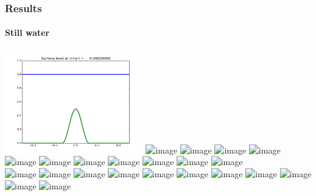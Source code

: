 \documentclass{beamer}
\begin{document}
\begin{frame}
  \frametitle{Results}
  \framesubtitle{Still water}
  \begin{center}
    \includegraphics[width=0.45\textwidth]{../results/still-cosine-initial.png}
    \includegraphics<1>[width=0.45\textwidth]{../results/still-cosine-unbalanced-01.png}
    \includegraphics<2>[width=0.45\textwidth]{../results/still-cosine-unbalanced-02.png}
    \includegraphics<3>[width=0.45\textwidth]{../results/still-cosine-unbalanced-03.png}
    \includegraphics<4>[width=0.45\textwidth]{../results/still-cosine-unbalanced-04.png}
    \includegraphics<5>[width=0.45\textwidth]{../results/still-cosine-unbalanced-05.png}
    \includegraphics<6>[width=0.45\textwidth]{../results/still-cosine-unbalanced-06.png}
    \includegraphics<7>[width=0.45\textwidth]{../results/still-cosine-unbalanced-07.png}
    \includegraphics<8>[width=0.45\textwidth]{../results/still-cosine-unbalanced-08.png}
    \includegraphics<9>[width=0.45\textwidth]{../results/still-cosine-unbalanced-09.png}
    \includegraphics<10>[width=0.45\textwidth]{../results/still-cosine-unbalanced-10.png}
    \includegraphics<11>[width=0.45\textwidth]{../results/still-cosine-unbalanced-11.png} \\
    \includegraphics<1>[width=0.45\textwidth]{../results/still-cosine-rogers-01.png}
    \includegraphics<2>[width=0.45\textwidth]{../results/still-cosine-rogers-02.png}
    \includegraphics<3>[width=0.45\textwidth]{../results/still-cosine-rogers-03.png}
    \includegraphics<4>[width=0.45\textwidth]{../results/still-cosine-rogers-04.png}
    \includegraphics<5>[width=0.45\textwidth]{../results/still-cosine-rogers-05.png}
    \includegraphics<6>[width=0.45\textwidth]{../results/still-cosine-rogers-06.png}
    \includegraphics<7>[width=0.45\textwidth]{../results/still-cosine-rogers-07.png}
    \includegraphics<8>[width=0.45\textwidth]{../results/still-cosine-rogers-08.png}
    \includegraphics<9>[width=0.45\textwidth]{../results/still-cosine-rogers-09.png}
    \includegraphics<10>[width=0.45\textwidth]{../results/still-cosine-rogers-10.png}
    \includegraphics<11>[width=0.45\textwidth]{../results/still-cosine-rogers-11.png}

\end{center}
\end{frame}
\end{document}
